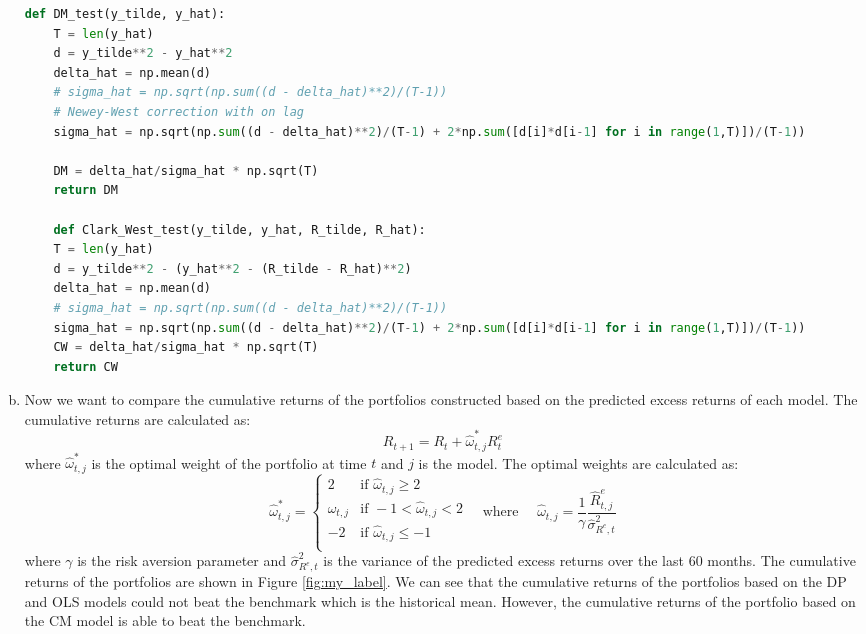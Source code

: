 \begin{enumerate}[(a)]
    \begin{lstlisting}[language=Python, caption=Python code for Diebold-Mariano test, label={lst:q1a}, escapechar=|, frame=single, basicstyle=\small, showstringspaces=false, captionpos=b, breaklines=true, showspaces=false, showtabs=false, keywordstyle=\color{blue}, commentstyle=\color{gray}]
        def DM_test(y_tilde, y_hat):
    T = len(y_hat)
    d = y_tilde**2 - y_hat**2
    delta_hat = np.mean(d)
    # sigma_hat = np.sqrt(np.sum((d - delta_hat)**2)/(T-1))
    # Newey-West correction with on lag
    sigma_hat = np.sqrt(np.sum((d - delta_hat)**2)/(T-1) + 2*np.sum([d[i]*d[i-1] for i in range(1,T)])/(T-1))

    DM = delta_hat/sigma_hat * np.sqrt(T)
    return DM

    def Clark_West_test(y_tilde, y_hat, R_tilde, R_hat):
    T = len(y_hat)
    d = y_tilde**2 - (y_hat**2 - (R_tilde - R_hat)**2)
    delta_hat = np.mean(d)
    # sigma_hat = np.sqrt(np.sum((d - delta_hat)**2)/(T-1))
    sigma_hat = np.sqrt(np.sum((d - delta_hat)**2)/(T-1) + 2*np.sum([d[i]*d[i-1] for i in range(1,T)])/(T-1))
    CW = delta_hat/sigma_hat * np.sqrt(T)
    return CW
    \end{lstlisting}

    \item Now we want to compare the cumulative returns of the portfolios constructed based on the predicted excess returns of each model. The cumulative returns are calculated as:
    \begin{equation*}
        R_{t+1} = R_{t} + \hat{\omega}_{t,j}^*R_{t}^e
    \end{equation*}
    where $\hat{\omega}_{t,j}^*$ is the optimal weight of the portfolio at time $t$ and $j$ is the model. The optimal weights are calculated as:
    \begin{equation*}
        \hat{\omega}_{t,j}^* = \begin{cases}
            2 & \text{if } \hat{\omega}_{t,j} \geq 2\\
            \hat{\omega}_{t,j} & \text{if } -1 < \hat{\omega}_{t,j} < 2\\
            -2 & \text{if } \hat{\omega}_{t,j} \leq -1\\
        \end{cases} \quad \text{where } \quad \hat{\omega}_{t,j} = \frac{1}{\gamma}\dfrac{\hat{R}^e_{t,j}}{\hat{\sigma}^2_{R^e,t}}
    \end{equation*}
    where $\gamma$ is the risk aversion parameter and $\hat{\sigma}^2_{R^e,t}$ is the variance of the predicted excess returns over the last 60 months. The cumulative returns of the portfolios are shown in Figure \ref{fig:my_label}. We can see that the cumulative returns of the portfolios based on the DP and OLS models could not beat the benchmark which is the historical mean. However, the cumulative returns of the portfolio based on the CM model is able to beat the benchmark.


\end{enumerate}
